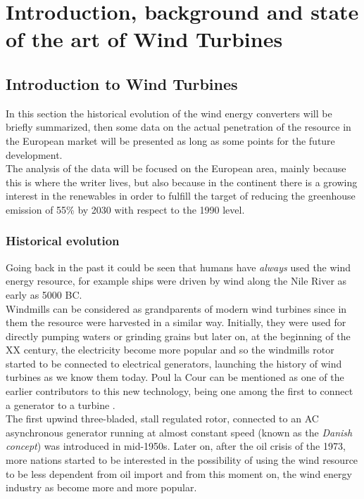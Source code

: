 \newpage
\section{Introduction, background and state of the art of Wind Turbines}\label{sec:c_state_of_the_art}
\subsection{Introduction to Wind Turbines}\label{subsec:c_WT_characteristics}
In this section the historical evolution of the wind energy converters will be briefly summarized, then some data on the actual penetration of the resource in the European market will be presented as long as some points for the future development. \\
The analysis of the data will be focused on the European area, mainly because this is where the writer lives, but also because in the continent there is a growing interest in the renewables in order to fulfill the target of reducing the greenhouse emission of 55\% by 2030 with respect to the 1990 level. 

\subsubsection{Historical evolution}
Going back in the past it could be seen that humans have \textit{always} used the wind energy resource, for example ships were driven by wind along the Nile River as early as 5000 BC.\\
Windmills can be considered as grandparents of modern wind turbines since in them the resource were harvested in a similar way. Initially, they were used for directly pumping waters or grinding grains but later on, at the beginning of the XX century, the electricity become more popular and so the windmills rotor started to be connected to electrical generators, launching the history of wind turbines as we know them today. Poul la Cour can be mentioned as one of the earlier contributors to this new technology, being one among the first to connect a generator to a turbine \cite{Aerodynamics_of_wind_turbines}. \\
The first upwind three-bladed, stall regulated rotor, connected to an AC asynchronous generator running at almost constant speed (known as the \textit{Danish concept}) was introduced in mid-1950s. Later on, after the oil crisis of the 1973, more nations started to be interested in the possibility of using the wind resource to be less dependent from oil import and from this moment on, the wind energy industry as become more and more popular. 

